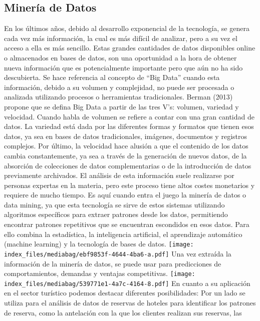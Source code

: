 \documentclass[
  letterpaper,
  DIV=11,
  numbers=noendperiod]{scrreprt}
\begin{document}
\hypertarget{mineruxeda-de-datos}{%
\subsection{Minería de Datos}\label{mineruxeda-de-datos}}

En los últimos años, debido al desarrollo exponencial de la tecnología,
se genera cada vez más información, la cual es más difícil de analizar,
pero a su vez el acceso a ella es más sencillo. Estas grandes cantidades
de datos disponibles online o almacenados en bases de datos, son una
oportunidad a la hora de obtener nueva información que es potencialmente
importante pero que aún no ha sido descubierta. Se hace referencia al
concepto de ``Big Data'' cuando esta información, debido a su volumen y
complejidad, no puede ser procesada o analizada utilizando procesos o
herramientas tradicionales. Berman (2013) propone que se defina Big Data
a partir de las tres V's: volumen, variedad y velocidad. Cuando habla de
volumen se refiere a contar con una gran cantidad de datos. La variedad
está dada por las diferentes formas y formatos que tienen esos datos, ya
sea en bases de datos tradicionales, imágenes, documentos y registros
complejos. Por último, la velocidad hace alusión a que el contenido de
los datos cambia constantemente, ya sea a través de la generación de
nuevos datos, de la absorción de colecciones de datos complementarias o
de la introducción de datos previamente archivados. El análisis de esta
información suele realizarse por personas expertas en la materia, pero
este proceso tiene altos costes monetarios y requiere de mucho tiempo.
Es aquí cuando entra el juego la minería de datos o data mining, ya que
esta tecnología se sirve de estos sistemas utilizando algoritmos
específicos para extraer patrones desde los datos, permitiendo encontrar
patrones repetitivos que se encuentran escondidos en esos datos. Para
ello combina la estadística, la inteligencia artificial, el aprendizaje
automático (machine learning) y la tecnología de bases de datos.
\texttt{[image: index\_files/mediabag/ebf9853f-4644-4ba6-a.pdf]} Una vez
extraída la información de la minería de datos, se puede usar para
predicciones de comportamientos, demandas y ventajas competitivas.
\texttt{[image: index\_files/mediabag/539771e1-4a7c-4164-8.pdf]} En
cuanto a su aplicación en el sector turístico podemos destacar
diferentes posibilidades: Por un lado se utiliza para el análisis de
datos de reservas de hoteles para identificar los patrones de reserva,
como la antelación con la que los clientes realizan sus reservas, las
\end{document}
